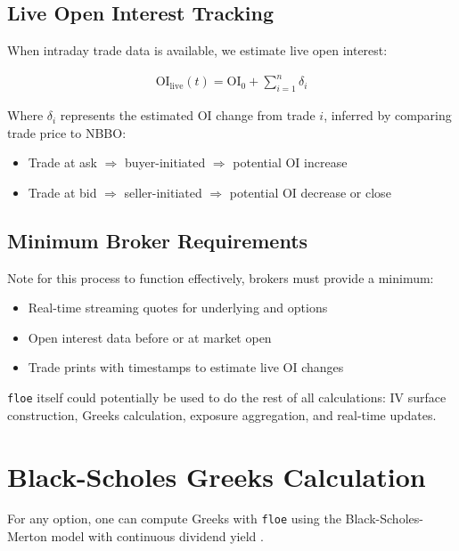 \documentclass[11pt, a4paper]{article}
\begin{document}
\subsection{Live Open Interest Tracking}

When intraday trade data is available, we estimate live open interest:

\begin{align}
\text{OI}_{\text{live}}(t) = \text{OI}_0 + \sum_{i=1}^{n} \delta_i
\end{align}

Where $\delta_i$ represents the estimated OI change from trade $i$, inferred by comparing trade price to NBBO:
\begin{itemize}
    \item Trade at ask $\Rightarrow$ buyer-initiated $\Rightarrow$ potential OI increase
    \item Trade at bid $\Rightarrow$ seller-initiated $\Rightarrow$ potential OI decrease or close
\end{itemize}


\subsection{Minimum Broker Requirements}

Note for this process to function effectively, brokers must provide a minimum:

\begin{itemize}
    \item Real-time streaming quotes for underlying and options
    \item Open interest data before or at market open
    \item Trade prints with timestamps to estimate live OI changes
\end{itemize}

\texttt{floe} itself could potentially be used to do the rest of all calculations: IV surface construction, Greeks calculation, exposure aggregation, and real-time updates.

\section{Black-Scholes Greeks Calculation}
\label{sec:black-scholes-greeks-calculation}

For any option, one can compute Greeks with \texttt{floe} using the Black-Scholes-Merton model with continuous dividend yield \cite{black1973pricing, merton1973theory}.
\end{document}
